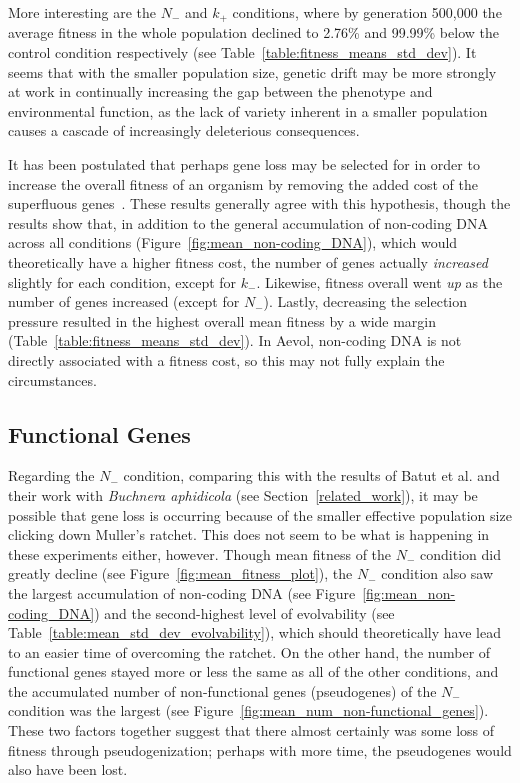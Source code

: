 More interesting are the $N_-$ and $k_+$ conditions, where by generation 500,000 the average fitness in the whole population declined to 2.76\% and 99.99\% below the control condition respectively (see Table~\ref{table:fitness_means_std_dev}). It seems that with the smaller population size, genetic drift may be more strongly at work in continually increasing the gap between the phenotype and environmental function, as the lack of variety inherent in a smaller population causes a cascade of increasingly deleterious consequences.
 
It has been postulated that perhaps gene loss may be selected for in order to increase the overall fitness of an organism by removing the added cost of the superfluous genes~\cite{koskiniemi2012}. These results generally agree with this hypothesis, though the results show that, in addition to the general accumulation of non-coding DNA across all conditions (Figure~\ref{fig:mean_non-coding_DNA}), which would theoretically have a higher fitness cost, the number of genes actually \textit{increased} slightly for each condition, except for $k_-$. Likewise, fitness overall went \textit{up} as the number of genes increased (except for $N_-$). Lastly, decreasing the selection pressure resulted in the highest overall mean fitness by a wide margin (Table~\ref{table:fitness_means_std_dev}). In Aevol, non-coding DNA is not directly associated with a fitness cost, so this may not fully explain the circumstances.  


\subsection{Functional Genes}
Regarding the $N_-$ condition, comparing this with the results of Batut et al. and their work with \textit{Buchnera aphidicola} (see Section~\ref{related_work}), it may be possible that gene loss is occurring because of the smaller effective population size clicking down Muller's ratchet. This does not seem to be what is happening in these experiments either, however. Though mean fitness of the $N_-$ condition did greatly decline (see Figure~\ref{fig:mean_fitness_plot}), the $N_-$ condition also saw the largest accumulation of non-coding DNA (see Figure~\ref{fig:mean_non-coding_DNA}) and the second-highest level of evolvability (see Table~\ref{table:mean_std_dev_evolvability}), which should theoretically have lead to an easier time of overcoming the ratchet. On the other hand, the number of functional genes stayed more or less the same as all of the other conditions, and the accumulated number of non-functional genes (pseudogenes) of the $N_-$ condition was the largest (see Figure~\ref{fig:mean_num_non-functional_genes}). These two factors together suggest that there almost certainly was some loss of fitness through pseudogenization; perhaps with more time, the pseudogenes would also have been lost.

